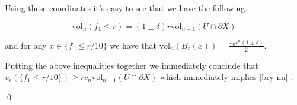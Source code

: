 \documentclass[12pt,leqno]{amsart}
\numberwithin{equation}{section}
\theoremstyle{definition}
\theoremstyle{remark}
\newcommand{\vol}{\mathrm{vol}}
\def\qeds{\qed\par\medskip}
\def\qedsf{\vskip-6mm\qeds}
\begin{document}
Using these coordinates it's easy to see that we have the following.

\[
\vol_n(f_1\le r)=(1\pm\delta)r\vol_{n-1}(U\cap\partial X)
\]

and for any $x\in \{f_1\le r/10\}$ we have that $\vol_n(B_r(x))=\frac{\omega_nr^n(1\pm\delta)}{2}$.

Putting the above inequalities together we immediately conclude that $v_r( \{f_1\le r/10\})\ge rc_n\vol_{n-1}(U\cap\partial X)$ which immediately implies \eqref{bry-nu} .

\qedsf








\end{document}
